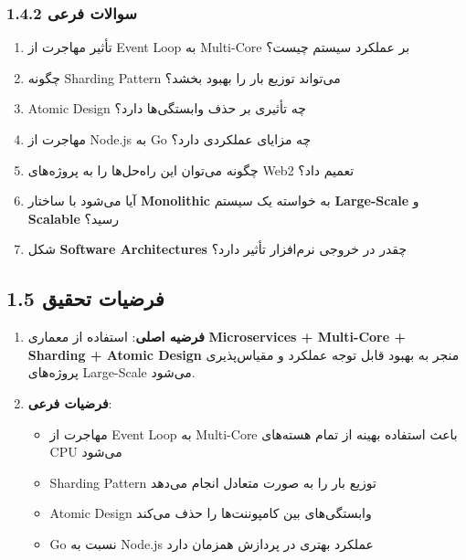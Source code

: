\documentclass[
]{article}
\providecommand{\tightlist}{%
  \setlength{\itemsep}{0pt}\setlength{\parskip}{0pt}}
\begin{document}
\subsubsection{1.4.2 سوالات
فرعی}\label{ux633ux648ux627ux644ux627ux62a-ux641ux631ux639ux6cc}

\begin{enumerate}
\def\labelenumi{\arabic{enumi}.}
\tightlist
\item
  تأثیر مهاجرت از Event Loop به Multi-Core بر عملکرد سیستم چیست؟
\item
  چگونه Sharding Pattern می‌تواند توزیع بار را بهبود بخشد؟
\item
  Atomic Design چه تأثیری بر حذف وابستگی‌ها دارد؟
\item
  مهاجرت از Node.js به Go چه مزایای عملکردی دارد؟
\item
  چگونه می‌توان این راه‌حل‌ها را به پروژه‌های Web2 تعمیم داد؟
\item
  آیا می‌شود با ساختار \textbf{Monolithic} به خواسته یک سیستم
  \textbf{Large-Scale} و \textbf{Scalable} رسید؟
\item
  شکل \textbf{Software Architectures} چقدر در خروجی نرم‌افزار تأثیر دارد؟
\end{enumerate}

\subsection{1.5 فرضیات
تحقیق}\label{ux641ux631ux636ux6ccux627ux62a-ux62aux62dux642ux6ccux642}

\begin{enumerate}
\def\labelenumi{\arabic{enumi}.}
\item
  \textbf{فرضیه اصلی}: استفاده از معماری \textbf{Microservices +
  Multi-Core + Sharding + Atomic Design} منجر به بهبود قابل توجه عملکرد
  و مقیاس‌پذیری پروژه‌های Large-Scale می‌شود.
\item
  \textbf{فرضیات فرعی}:

  \begin{itemize}
  \tightlist
  \item
    مهاجرت از Event Loop به Multi-Core باعث استفاده بهینه از تمام
    هسته‌های CPU می‌شود
  \item
    Sharding Pattern توزیع بار را به صورت متعادل انجام می‌دهد
  \item
    Atomic Design وابستگی‌های بین کامپوننت‌ها را حذف می‌کند
  \item
    Go نسبت به Node.js عملکرد بهتری در پردازش همزمان دارد
  \end{itemize}
\end{enumerate}
\end{document}
